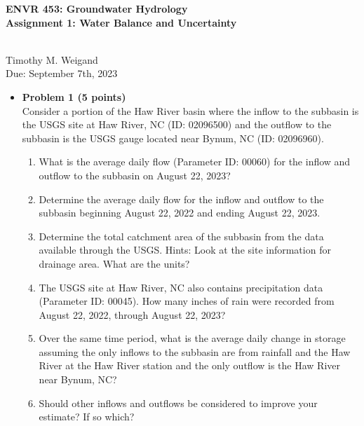 \documentclass[11pt]{report}
\begin{document}
\begin{center}
\begin{Large}\textbf{ENVR 453: Groundwater Hydrology \\ Assignment 1: Water Balance and Uncertainty} \end{Large}
\\ \vspace{0.1cm} Timothy M. Weigand \vspace{0.1cm}\\ 
Due: September 7th, 2023
\end{center}

\vspace{0.2cm}


\begin{itemize}
\item {\bf Problem 1 (5 points) } \\
Consider a portion of the Haw River basin where the  inflow to the subbasin is the USGS site at Haw River, NC (ID: 02096500) and the outflow to the subbasin is the USGS gauge located near Bynum, NC (ID: 02096960). 

\begin{enumerate}[label=(\roman*)]
    \item What is the average daily flow (Parameter ID: 00060) for the inflow and outflow to the subbasin on August 22, 2023?
    \item Determine the average daily flow for the inflow and outflow to the subbasin beginning August 22, 2022 and ending August 22, 2023.  
    \item Determine the total catchment area of the subbasin from the data available through the USGS. Hints: Look at the site information for drainage area. What are the units? 
    \item The USGS site at Haw River, NC also contains precipitation data (Parameter ID: 00045). How many inches of rain were recorded from August 22, 2022, through August 22, 2023? 
    \item Over the same time period, what is the average daily change in storage assuming the only inflows to the subbasin are from rainfall and the Haw River at the Haw River station and the only outflow is the Haw River near Bynum, NC?
    \item Should other inflows and outflows be considered to improve your estimate? If so which?      
\end{enumerate}


\end{itemize}
\end{document}
